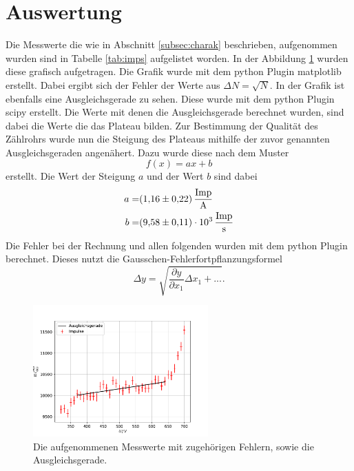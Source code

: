 \section{Auswertung}
\label{sec:Auswertung}

Die Messwerte die wie in Abschnitt \ref{subsec:charak} beschrieben, aufgenommen wurden sind in Tabelle \ref{tab:imps} aufgelistet worden.
In der Abbildung \ref{fig:imps} wurden diese grafisch aufgetragen.
Die Grafik wurde mit dem python Plugin matplotlib \cite{matplotlib} erstellt.
Dabei ergibt sich der Fehler der Werte aus $\Delta N = \sqrt{N}$.
In der Grafik  ist ebenfalls eine Ausgleichsgerade zu sehen.
Diese wurde mit dem python Plugin scipy \cite{scipy} erstellt.
Die Werte mit denen die Ausgleichsgerade berechnet wurden, sind dabei die Werte die das Plateau bilden.
Zur Bestimmung der Qualität des Zählrohrs wurde nun die Steigung des Plateaus mithilfe der zuvor genannten Ausgleichsgeraden angenähert.
Dazu wurde diese nach dem Muster 
\begin{equation*}
  f(x) = ax +b 
\end{equation*} 
erstellt.
Die Wert der Steigung $a$ und der Wert $b$ sind dabei
\begin{align*}
  a =& \SI{1.16(22)}{\frac{\text{Imp}}{\A}} \\
  b =& \SI{9.58(11)e03}{\frac{\text{Imp}}{\second}}\\
\end{align*}
Die Fehler bei der Rechnung und allen folgenden wurden mit dem python Plugin \cite{uncertainties} berechnet.
Dieses nutzt die Gausschen-Fehlerfortpflanzungsformel 
\begin{equation*}
  \Delta y = \sqrt{\frac{\partial y}{\partial x_1}\Delta x_1+...}.
\end{equation*}

\begin{figure}
  \centering
  \includegraphics[width=0.6\textwidth]{content/data/kennlinie.pdf}
  \caption{Die aufgenommenen Messwerte mit zugehörigen Fehlern, sowie die Ausgleichsgerade.}
  \label{fig:imps}
\end{figure}

